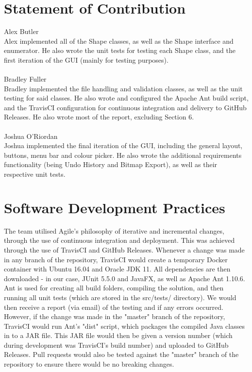 \documentclass[12pt]{article} %
\begin{document}
\newpage

\section{Statement of Contribution}

{\large Alex Butler}\\
Alex implemented all of the Shape classes, as well as the Shape interface and enumerator. He also wrote the unit tests for testing each Shape class, and the first iteration of the GUI (mainly for testing purposes). 
\\\\{\large Bradley Fuller}\\
Bradley implemented the file handling and validation classes, as well as the unit testing for said classes. He also wrote and configured the Apache Ant build script, and the TravisCI configuration for continuous integration and delivery to GitHub Releases. He also wrote most of the report, excluding Section 6.
\\\\{\large Joshua O'Riordan}\\
Joshua implemented the final iteration of the GUI, including the general layout, buttons, menu bar and colour picker. He also wrote the additional requirements functionality (being Undo History and Bitmap Export), as well as their respective unit tests.

\newpage

\section{Software Development Practices}

The team utilised Agile's philosophy of iterative and incremental changes, through the use of continuous integration and deployment. This was achieved through the use of TravisCI and GitHub Releases. Whenever a change was made in any branch of the repository, TravisCI would create a temporary Docker container with Ubuntu 16.04 and Oracle JDK 11. All dependencies are then downloaded - in our case, JUnit 5.5.0 and JavaFX, as well as Apache Ant 1.10.6. Ant is used for creating all build folders, compiling the solution, and then running all unit tests (which are stored in the src/tests/ directory). We would then receive a report (via email) of the testing and if any errors occurred. However, if the change was made in the "master" branch of the repository, TravisCI would run Ant's "dist" script, which packages the compiled Java classes in to a JAR file. This JAR file would then be given a version number (which during development was TravisCI's build number) and uploaded to GitHub Releases. Pull requests would also be tested against the "master" branch of the repository to ensure there would be no breaking changes.
\end{document}

